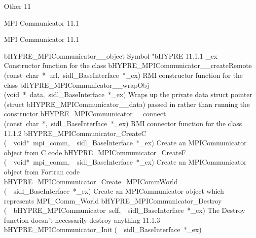 \documentclass{article}
\begin{document}
\begin{cxxentry}
{}
        {Other}
        {}
        {
}
        {11}
\begin{cxxnames}
\cxxitem{}
        {MPI Communicator}
        {}
        {
}
        {11.1}
\end{cxxnames}
\begin{cxxentry}
{}
        {MPI Communicator}
        {}
        {
}
        {11.1}
\begin{cxxnames}
        {bHYPRE\_MPICommunicator\_\_object}
        {}
        {
Symbol "bHYPRE}
        {11.1.1}
        {\_ex}
        {}
        {
Constructor function for the class}
        {}
\label{cxx.11.1.5}
        {bHYPRE\_MPICommunicator\_\_createRemote}
        {(const\ char\ *\ url,\ sidl\_BaseInterface\ *\_ex)}
        {
RMI constructor function for the class}
        {}
\label{cxx.11.1.6}
        {bHYPRE\_MPICommunicator\_\_wrapObj}
        {(void\ *\ data,\ sidl\_BaseInterface\ *\_ex)}
        {
Wraps up the private data struct pointer (struct bHYPRE\_MPICommunicator\_\_data) passed in rather than running the constructor}
        {}
\label{cxx.11.1.7}
        {bHYPRE\_MPICommunicator\_\_connect}
        {(const\ char\ *,\ sidl\_BaseInterface\ *\_ex)}
        {
RMI connector function for the class}
        {11.1.2}
        {bHYPRE\_MPICommunicator\_CreateC}
        {(\ \ void*\ mpi\_comm,\ \ sidl\_BaseInterface\ *\_ex)}
        {
Create an MPICommunicator object from C code}
        {}
\label{cxx.11.1.8}
        {bHYPRE\_MPICommunicator\_CreateF}
        {(\ \ void*\ mpi\_comm,\ \ sidl\_BaseInterface\ *\_ex)}
        {
Create an MPICommunicator object from Fortran code}
        {}
\label{cxx.11.1.9}
        {bHYPRE\_MPICommunicator\_Create\_MPICommWorld}
        {(\ \ sidl\_BaseInterface\ *\_ex)}
        {
Create an MPICommunicator object which represents MPI\_Comm\_World}
        {}
\label{cxx.11.1.10}
        {bHYPRE\_MPICommunicator\_Destroy}
        {(\ \ bHYPRE\_MPICommunicator\ self,\ \ sidl\_BaseInterface\ *\_ex)}
        {
The Destroy function doesn't necessarily destroy anything}
        {11.1.3}
        {bHYPRE\_MPICommunicator\_Init}
        {(\ \ sidl\_BaseInterface\ *\_ex)}

\end{cxxnames}
\end{cxxentry}
\end{cxxentry}
\end{document}
